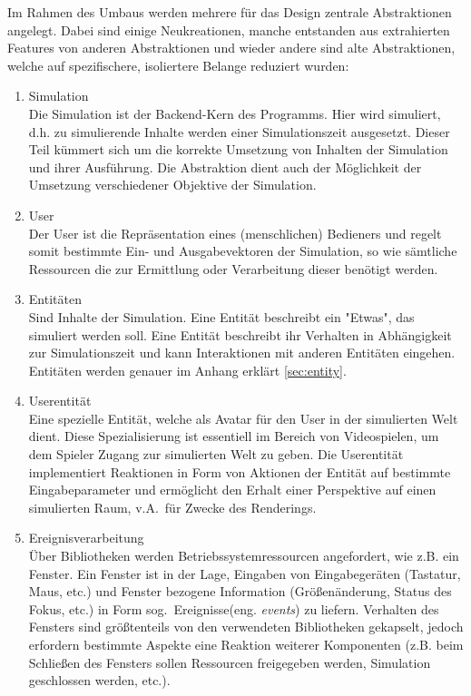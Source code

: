 \documentclass[11pt,twoside,a4paper]{article}
\begin{document}
Im Rahmen des Umbaus werden mehrere für das Design zentrale Abstraktionen angelegt. Dabei sind einige Neukreationen, manche entstanden aus extrahierten Features von anderen Abstraktionen und wieder andere sind alte Abstraktionen, welche auf spezifischere, isoliertere Belange reduziert wurden:

\begin{enumerate}
\item Simulation\\
Die Simulation ist der Backend-Kern des Programms. Hier wird simuliert, d.h. zu simulierende Inhalte werden einer Simulationszeit ausgesetzt. Dieser Teil kümmert sich um die korrekte Umsetzung von Inhalten der Simulation und ihrer Ausführung. Die Abstraktion dient auch der Möglichkeit der Umsetzung verschiedener Objektive der Simulation.
\item User\\
Der User ist die Repräsentation eines (menschlichen) Bedieners und regelt somit bestimmte Ein- und Ausgabevektoren der Simulation, so wie sämtliche Ressourcen die zur Ermittlung oder Verarbeitung dieser benötigt werden.
\item Entitäten\\
Sind Inhalte der Simulation. Eine Entität beschreibt ein "Etwas", das simuliert werden soll. Eine Entität beschreibt ihr Verhalten in Abhängigkeit zur Simulationszeit und kann Interaktionen mit anderen Entitäten eingehen. Entitäten werden genauer im Anhang erklärt \ref{sec:entity}.
\item Userentität\\
Eine spezielle Entität, welche als Avatar für den User in der simulierten Welt dient. Diese Spezialisierung ist essentiell im Bereich von Videospielen, um dem Spieler Zugang zur simulierten Welt zu geben. Die Userentität implementiert Reaktionen in Form von Aktionen der Entität auf bestimmte Eingabeparameter und ermöglicht den Erhalt einer Perspektive auf einen simulierten Raum, v.A.~für Zwecke des Renderings.
\item Ereignisverarbeitung\\
Über Bibliotheken werden Betriebssystemressourcen angefordert, wie z.B. ein Fenster. Ein Fenster ist in der Lage, Eingaben von Eingabegeräten (Tastatur, Maus, etc.) und Fenster bezogene Information (Größenänderung, Status des Fokus, etc.) in Form sog.~Ereignisse(eng. \textit{events}) zu liefern. Verhalten des Fensters sind größtenteils von den verwendeten Bibliotheken gekapselt, jedoch erfordern bestimmte Aspekte eine Reaktion weiterer Komponenten (z.B. beim Schließen des Fensters sollen Ressourcen freigegeben werden, Simulation geschlossen werden, etc.).

\end{enumerate}
\end{document}
